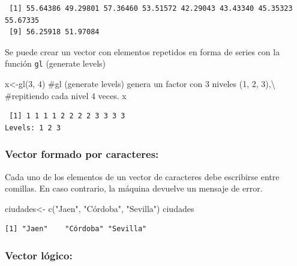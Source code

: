 \documentclass[
  letterpaper,
  DIV=11,
  numbers=noendperiod]{scrreprt}
\newenvironment{Shaded}{\begin{snugshade}}{\end{snugshade}}
\newcommand{\CommentTok}[1]{\textcolor[rgb]{0.37,0.37,0.37}{#1}}
\newcommand{\DecValTok}[1]{\textcolor[rgb]{0.68,0.00,0.00}{#1}}
\newcommand{\FunctionTok}[1]{\textcolor[rgb]{0.28,0.35,0.67}{#1}}
\newcommand{\NormalTok}[1]{\textcolor[rgb]{0.00,0.23,0.31}{#1}}
\newcommand{\OtherTok}[1]{\textcolor[rgb]{0.00,0.23,0.31}{#1}}
\newcommand{\StringTok}[1]{\textcolor[rgb]{0.13,0.47,0.30}{#1}}
\begin{document}
\begin{verbatim}
 [1] 55.64386 49.29801 57.36460 53.51572 42.29043 43.43340 45.35323 55.67335
 [9] 56.25918 51.97084
\end{verbatim}

Se puede crear un vector con elementos repetidos en forma de series con
la función \texttt{gl} (generate levels)

\begin{Shaded}
\begin{Highlighting}[]
\NormalTok{x}\OtherTok{\textless{}{-}}\FunctionTok{gl}\NormalTok{(}\DecValTok{3}\NormalTok{, }\DecValTok{4}\NormalTok{) }\CommentTok{\#gl (generate levels) genera un factor con 3 niveles (1, 2, 3),\textbackslash{}}
\CommentTok{\#repitiendo cada nivel 4 veces. }
\NormalTok{x }
\end{Highlighting}
\end{Shaded}

\begin{verbatim}
 [1] 1 1 1 1 2 2 2 2 3 3 3 3
Levels: 1 2 3
\end{verbatim}

\hypertarget{vector-formado-por-caracteres}{%
\subsubsection{Vector formado por
caracteres:}\label{vector-formado-por-caracteres}}

Cada uno de los elementos de un vector de caracteres debe escribirse
entre comillas. En caso contrario, la máquina devuelve un mensaje de
error.

\begin{Shaded}
\begin{Highlighting}[]
\NormalTok{ciudades}\OtherTok{\textless{}{-}} \FunctionTok{c}\NormalTok{(}\StringTok{"Jaen"}\NormalTok{, }\StringTok{"Córdoba"}\NormalTok{, }\StringTok{"Sevilla"}\NormalTok{)}
\NormalTok{ciudades}
\end{Highlighting}
\end{Shaded}

\begin{verbatim}
[1] "Jaen"    "Córdoba" "Sevilla"
\end{verbatim}

\hypertarget{vector-luxf3gico}{%
\subsubsection{Vector lógico:}\label{vector-luxf3gico}}
\end{document}
